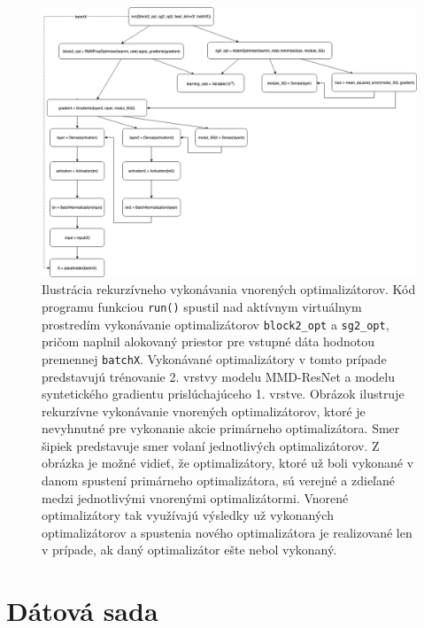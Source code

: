 \begin{figure}
\centerline{\includegraphics[width=1.0\textwidth]{images/rekurzivne.png}}
\caption[Ilustrácia rekurzívneho vykonávania vnorených optimalizátorov]{Ilustrácia rekurzívneho vykonávania vnorených optimalizátorov. Kód programu funkciou \texttt{run()} spustil nad aktívnym virtuálnym prostredím vykonávanie optimalizátorov \texttt{block2_opt} a \texttt{sg2_opt}, pričom naplnil alokovaný priestor pre vstupné dáta hodnotou premennej \texttt{batchX}. Vykonávané optimalizátory v tomto prípade predstavujú trénovanie 2. vrstvy modelu MMD-ResNet a modelu syntetického gradientu prislúchajúceho 1. vrstve. Obrázok ilustruje rekurzívne vykonávanie vnorených optimalizátorov, ktoré je nevyhnutné pre vykonanie akcie primárneho optimalizátora. Smer šipiek predstavuje smer volaní jednotlivých optimalizátorov. Z obrázka je možné vidieť, že optimalizátory, ktoré už boli vykonané v danom spustení primárneho optimalizátora, sú verejné a zdieľané medzi jednotlivými vnorenými optimalizátormi. Vnorené optimalizátory tak využívajú výsledky už vykonaných optimalizátorov a spustenia nového optimalizátora je realizované len v prípade, ak daný optimalizátor ešte nebol vykonaný.}
\label{rekurzivne}
\end{figure}

\section{Dátová sada}
\label{data_sets}

